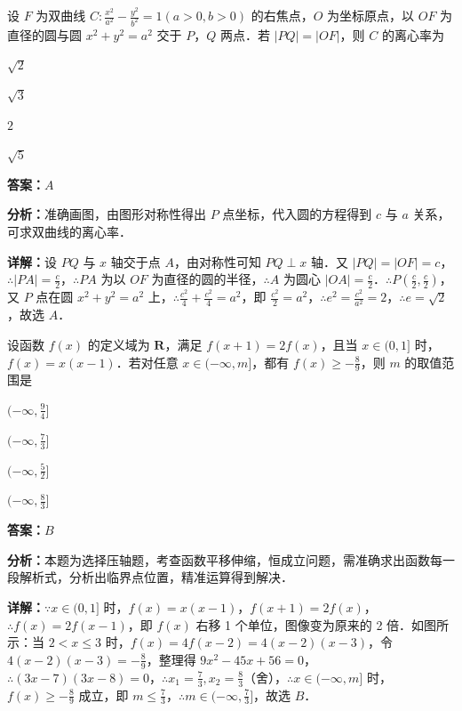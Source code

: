 \begin{question}[points=5]
设 $F$ 为双曲线 $C:\frac{x^2}{a^2}-\frac{y^2}{b^2}=1(a>0,b>0)$ 的右焦点，$O$ 为坐标原点，以 $OF$ 为直径的圆与圆 $x^2+y^2=a^2$ 交于 $P$，$Q$ 两点．若 $|PQ|=|OF|$，则 $C$ 的离心率为
\begin{choices}
  \item $\sqrt{2}$
  \item $\sqrt{3}$
  \item $2$
  \item $\sqrt{5}$
\end{choices}
\begin{solution}
\textbf{答案：}$A$

\textbf{分析：}准确画图，由图形对称性得出 $P$ 点坐标，代入圆的方程得到 $c$ 与 $a$ 关系，可求双曲线的离心率．

\textbf{详解：}设 $PQ$ 与 $x$ 轴交于点 $A$，由对称性可知 $PQ\perp x$ 轴．又 $|PQ|=|OF|=c$，$\therefore |PA|=\frac{c}{2}$，$\therefore PA$ 为以 $OF$ 为直径的圆的半径，$\therefore A$ 为圆心 $|OA|=\frac{c}{2}$．$\therefore P(\frac{c}{2},\frac{c}{2})$，又 $P$ 点在圆 $x^2+y^2=a^2$ 上，$\therefore \frac{c^2}{4}+\frac{c^2}{4}=a^2$，即 $\frac{c^2}{2}=a^2$，$\therefore e^2=\frac{c^2}{a^2}=2$，$\therefore e=\sqrt{2}$，故选 $A$．
\end{solution}
\end{question}

\begin{question}[points=5]
设函数 $f(x)$ 的定义域为 $\mathbf{R}$，满足 $f(x+1)=2f(x)$，且当 $x\in(0,1]$ 时，$f(x)=x(x-1)$．若对任意 $x\in(-\infty,m]$，都有 $f(x)\geq -\frac{8}{9}$，则 $m$ 的取值范围是
\begin{choices}
  \item $(-\infty,\frac{9}{4}]$
  \item $(-\infty,\frac{7}{3}]$
  \item $(-\infty,\frac{5}{2}]$
  \item $(-\infty,\frac{8}{3}]$
\end{choices}
\begin{solution}
\textbf{答案：}$B$

\textbf{分析：}本题为选择压轴题，考查函数平移伸缩，恒成立问题，需准确求出函数每一段解析式，分析出临界点位置，精准运算得到解决．

\textbf{详解：}$\because x\in(0,1]$ 时，$f(x)=x(x-1)$，$f(x+1)=2f(x)$，$\therefore f(x)=2f(x-1)$，即 $f(x)$ 右移 1 个单位，图像变为原来的 2 倍．如图所示：当 $2<x\leq 3$ 时，$f(x)=4f(x-2)=4(x-2)(x-3)$，令 $4(x-2)(x-3)=-\frac{8}{9}$，整理得 $9x^2-45x+56=0$，$\therefore (3x-7)(3x-8)=0$，$\therefore x_1=\frac{7}{3},x_2=\frac{8}{3}$（舍），$\therefore x\in(-\infty,m]$ 时，$f(x)\geq -\frac{8}{9}$ 成立，即 $m\leq \frac{7}{3}$，$\therefore m\in(-\infty,\frac{7}{3}]$，故选 $B$．
\end{solution}
\end{question}

